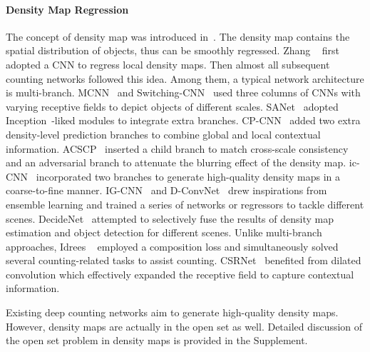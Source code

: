 \documentclass[10pt,twocolumn,letterpaper]{article}
\begin{document}
	\paragraph{Density Map Regression}
	The concept of density map was introduced in~\cite{vlaz2010denlearn}. The density map contains the spatial distribution of objects, thus can be smoothly regressed. Zhang \etal~\cite{Zhang_2015_CVPR} first adopted a CNN to regress local density maps. Then almost all subsequent counting networks followed this idea. Among them, a typical network architecture is multi-branch. MCNN~\cite{MCNN_2016_CVPR} and Switching-CNN~\cite{SwitchCNN_2017_CVPR} used three columns of CNNs with varying receptive fields to depict objects of different scales. SANet~\cite{SANet_2018_ECCV} adopted Inception~\cite{GoogleNet_2015_CVPR}-liked modules to integrate extra branches. 
	CP-CNN~\cite{CPCNN_2017_ICCV} added two extra density-level prediction branches to combine global and local contextual information. ACSCP~\cite{ACSCP_2018_CVPR} inserted a child branch to match cross-scale consistency and an adversarial branch to attenuate the blurring effect of the density map. ic-CNN~\cite{ICNN_2018_ECCV} incorporated two branches to generate high-quality density maps in a coarse-to-fine manner. IG-CNN~\cite{Divide_grow_2018_CVPR} and D-ConvNet~\cite{DeepNegCor_2018_CVPR} drew inspirations from ensemble learning and trained a series of networks or regressors to tackle different scenes. DecideNet~\cite{DecideNet_2018_CVPR} attempted to selectively fuse the results of density map estimation and object detection for different scenes. Unlike multi-branch approaches, Idrees \etal~\cite{Compose_Loss_2018_ECCV} employed a composition loss and simultaneously solved several counting-related tasks to assist counting. CSRNet~\cite{CSRNet_2018_CVPR} benefited from dilated convolution which effectively expanded the receptive field to capture contextual information.
	
	Existing deep counting networks aim to generate high-quality density maps. However, density maps are actually in the open set as well. Detailed discussion of the open set problem in density maps is provided in the Supplement.



	\vspace{-10pt}
\end{document}
